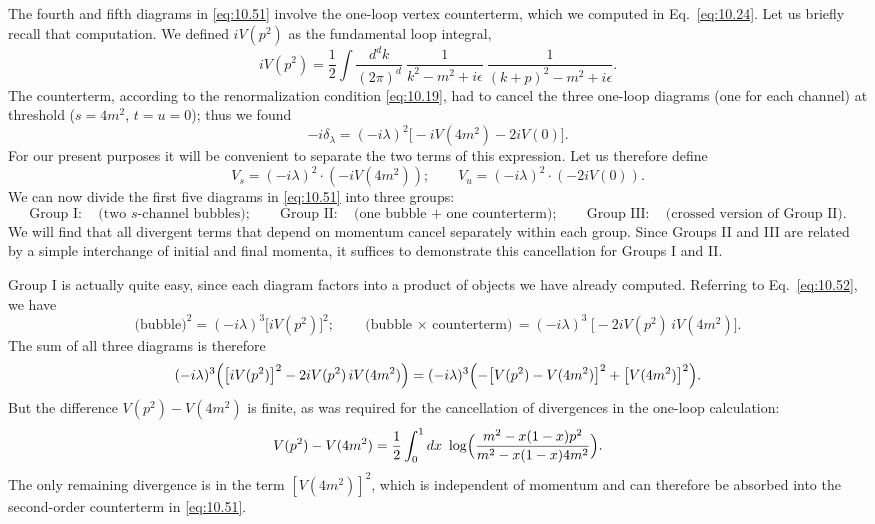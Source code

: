 The fourth and fifth diagrams in \eqref{eq:10.51} involve the one-loop vertex
counterterm, which we computed in Eq.~\eqref{eq:10.24}.  Let us briefly recall
that computation.  We defined $iV(p^2)$ as the fundamental loop integral,
\begin{equation}
  iV(p^2) = \frac{1}{2}\int \frac{d^dk}{(2\pi)^d}\ \frac{1}{k^2-m^2+i\epsilon}\
    \frac{1}{(k+p)^2-m^2+i\epsilon} .
  \label{eq:10.52}
\end{equation}
The counterterm, according to the renormalization condition \eqref{eq:10.19},
had to cancel the three one-loop diagrams (one for each channel) at threshold
($s = 4m^2$, $t = u = 0$); thus we found
\begin{equation}
  -i\delta_\lambda = (-i\lambda)^2\bigl[ -iV(4m^2) - 2iV(0) \bigr] .
\end{equation}
For our present purposes it will be convenient to separate the two terms of
this expression.  Let us therefore define
\begin{equation}
  V_s = (-i\lambda)^2\cdot(-iV(4m^2));\qquad
  V_u = (-i\lambda)^2\cdot(-2iV(0)) .
\end{equation}
We can now divide the first five diagrams in \eqref{eq:10.51} into three
groups:
\begin{equation}
  \text{Group I}:\quad \text{(two } s\text{-channel bubbles)};\qquad
  \text{Group II}:\quad \text{(one bubble + one counterterm)};\qquad
  \text{Group III}:\quad \text{(crossed version of Group II)} .
\end{equation}
We will find that all divergent terms that depend on momentum cancel
separately within each group.  Since Groups II and III are related by a simple
interchange of initial and final momenta, it suffices to demonstrate this
cancellation for Groups I and II.

Group I is actually quite easy, since each diagram factors into a product of
objects we have already computed.  Referring to Eq.~\eqref{eq:10.52}, we have
\begin{equation}
  \text{(bubble)}^2 = (-i\lambda)^3\bigl[ iV(p^2) \bigr]^2;
  \qquad \text{(bubble $\times$ counterterm)} = (-i\lambda)^3\
    \bigl[ -2iV(p^2)\,iV(4m^2) \bigr] .
\end{equation}
The sum of all three diagrams is therefore
\begin{equation}
  (-i\lambda)^3\Bigl( \bigl[ iV(p^2) \bigr]^2 - 2iV(p^2)\,iV(4m^2)
    \Bigr)
  = (-i\lambda)^3\Bigl( -\bigl[ V(p^2) - V(4m^2) \bigr]^2
    + \bigl[ V(4m^2) \bigr]^2 \Bigr) .
  \label{eq:10.53}
\end{equation}
But the difference $V(p^2) - V(4m^2)$ is finite, as was required for the
cancellation of divergences in the one-loop calculation:
\begin{equation}
  V(p^2) - V(4m^2) = \frac{1}{2}\int_0^1 dx\ \log\Bigl(
    \frac{m^2 - x(1-x)p^2}{m^2 - x(1-x)4m^2} \Bigr) .
\end{equation}
The only remaining divergence is in the term $[V(4m^2)]^2$, which is
independent of momentum and can therefore be absorbed into the second-order
counterterm in \eqref{eq:10.51}.

